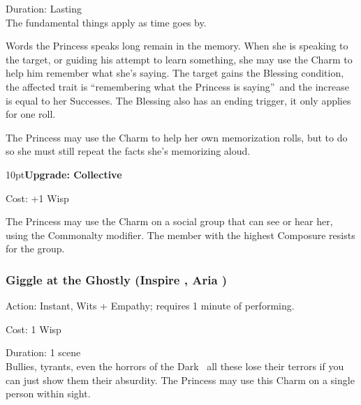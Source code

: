 \noindent Duration: Lasting\\ 

\noindent The fundamental things apply as time goes by.

Words the Princess speaks long remain in the memory. When she is speaking to the target, or guiding his attempt to learn something, she may use the Charm to help him remember what she's saying. The target gains the Blessing condition, the affected trait is \textquotedblleft remembering what the Princess is saying\textquotedblright\, and the increase is equal to her Successes. The Blessing also has an ending trigger, it only applies for one roll.

The Princess may use the Charm to help her own memorization rolls, but to do so she must still repeat the facts she's memorizing aloud.

\begin{myindentpar}{10pt}\textbf{Upgrade: Collective}

\noindent Cost: +1 Wisp

The Princess may use the Charm on a social group that can see or hear her, using the Commonalty modifier. The member with the highest Composure resists for the group.\end{myindentpar}

\subsubsection*{Giggle at the Ghostly (Inspire \textbullet\textbullet, Aria \textbullet)}

\noindent Action: Instant, Wits + Empathy; requires 1 minute of performing. 

\noindent Cost: 1 Wisp

\noindent Duration: 1 scene \\

\noindent Bullies, tyrants, even the horrors of the Dark \textendash\, all these lose their terrors if you can just show them their absurdity. The Princess may use this Charm on a single person within sight.

